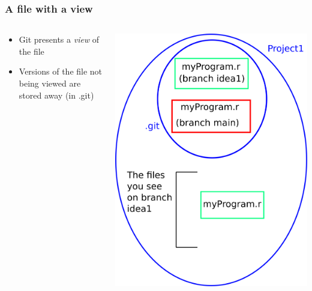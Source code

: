 \documentclass{beamer}
\begin{document}
\begin{frame}
  \frametitle{A file with a view}
  \begin{columns}[T]
    \begin{column}{.5\textwidth}
      \begin{itemize}
      \item Git presents a \emph{view} of the file
      \item Versions of the file not being viewed are stored away (in
        \alert{.git})
      \end{itemize}
    \end{column}
    \begin{column}{.5\textwidth}
      \includegraphics[width=\textwidth]{with_git2.png}
    \end{column}
  \end{columns}
\end{frame}


\end{document}
